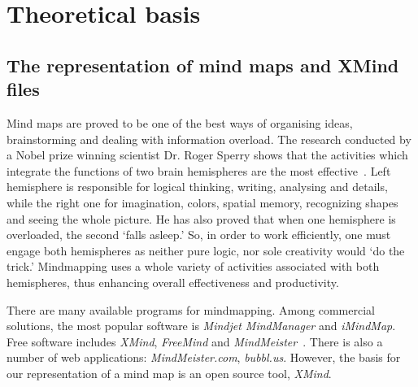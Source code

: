 %
%
%
%
%

\chapter{Theoretical basis}
\label{chap:theory}

\section{The representation of mind maps and XMind files}
\label{sec:xmind}

Mind maps are proved to be one of the best ways of organising ideas, brainstorming and dealing with information overload. The research conducted by a Nobel prize winning scientist Dr. Roger Sperry shows that the activities which integrate the functions of two brain hemispheres are the most effective~\cite{Voneida:1998:Sperry}. Left hemisphere is responsible for logical thinking, writing, analysing and details, while the right one for imagination, colors, spatial memory, recognizing shapes and seeing the whole picture. He has also proved that when one hemisphere is overloaded, the second `falls asleep.' So, in order to work efficiently, one must engage both hemispheres as neither pure logic, nor sole creativity would `do the trick.' Mindmapping uses a whole variety of activities associated with both hemispheres, thus enhancing overall effectiveness and productivity.

There are many available programs for mindmapping. Among commercial solutions, the most popular software is {\em Mindjet MindManager} and {\em iMindMap}. Free software includes {\em XMind}, {\em FreeMind} and \emph{MindMeister}~\cite{Wiki:Software}. There is also a number of web applications: \emph{MindMeister.com}, \emph{bubbl.us}. However, the basis for our representation of a mind map is an open source tool, {\em XMind}.

